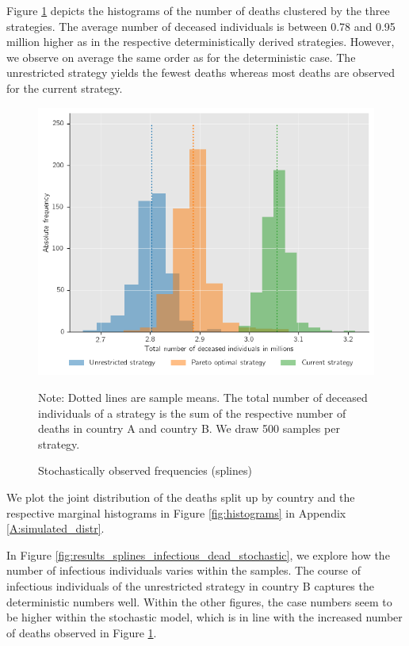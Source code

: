 Figure \ref{fig:results_splines_stochastic_histogram} depicts the histograms of the number of deaths clustered by the three strategies. The average number of deceased individuals is between 0.78 and 0.95 million higher as in the respective deterministically derived strategies. However, we observe on average the same order as for the deterministic case. The unrestricted strategy yields the fewest deaths whereas most deaths are observed for the current strategy. 
\begin{figure}[h!]
\centering
\includegraphics[scale=0.65]{images/splines_stochastic_histogram.png}
\begin{flushleft}
\scriptsize{Note:} Dotted lines are sample means. The total number of deceased individuals of a strategy is the sum of the respective number of deaths in country A and country B. We draw 500 samples per strategy. 
\end{flushleft}
\caption{Stochastically observed frequencies (splines)}
\label{fig:results_splines_stochastic_histogram}
\end{figure}
We plot the joint distribution of the deaths split up by country and the respective marginal histograms in Figure \ref{fig:histograms} in Appendix \ref{A:simulated_distr}.

In Figure \ref{fig:results_splines_infectious_dead_stochastic}, we explore how the number of infectious individuals varies within the samples. The course of infectious individuals of the unrestricted strategy in country B captures the deterministic numbers well. Within the other figures, the case numbers seem to be higher within the stochastic model, which is in line with the increased number of deaths observed in Figure \ref{fig:results_splines_stochastic_histogram}.

